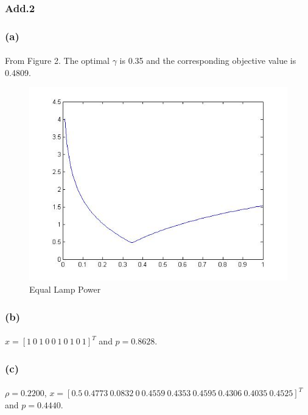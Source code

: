 \subsubsection*{Add.2}
\subsubsection*{(a)}
\paragraph{}
From Figure 2. The optimal $\gamma$ is 0.35 and the corresponding objective value is 0.4809.
\begin{figure}[h]
	\centering
	\includegraphics[scale=0.5]{equalpower}
	\caption{Equal Lamp Power}
\end{figure}
\subsubsection*{(b)}
\paragraph{}
$x = [1\ 0\ 1\ 0\ 0\ 1\ 0\ 1\ 0\ 1]^T$ and $p=0.8628$.
\subsubsection*{(c)}
\paragraph{}
$\rho =0.2200$,  $x = [0.5\ 0.4773\ 0.0832\ 0\ 0.4559\ 0.4353\ 0.4595\ 0.4306\ 0.4035\ 0.4525]^T$ and $p=0.4440$.
